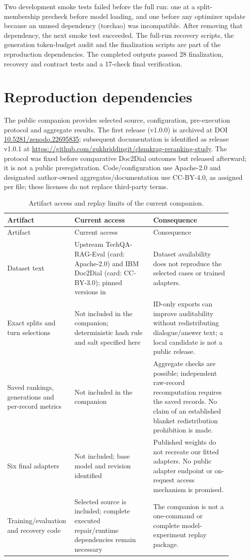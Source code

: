 Two development smoke tests failed before the full run: one at a split-membership precheck before model loading, and one before any optimizer update because an unused dependency (torchao) was incompatible. After removing that dependency, the next smoke test succeeded. The full-run recovery scripts, the generation token-budget audit and the finalization scripts are part of the reproduction dependencies. The completed outputs passed 28 finalization, recovery and contract tests and a 17-check final verification.

\section{Reproduction dependencies}\label{supp:repro}
The public companion provides selected source, configuration, pre-execution protocol and aggregate results. The first release (v1.0.0) is archived at DOI \href{https://doi.org/10.5281/zenodo.22695835}{\mbox{10.5281/zenodo.22695835}}; subsequent documentation is identified as release v1.0.1 at \url{https://github.com/zukhriddingit/chunkrag-reranking-study}. The protocol was fixed before comparative Doc2Dial outcomes but released afterward; it is not a public preregistration. Code/configuration use Apache-2.0 and designated author-owned aggregates/documentation use CC-BY-4.0, as assigned per file; these licenses do not replace third-party terms.

\begin{longtable}{P{0.24\linewidth}P{0.34\linewidth}P{0.34\linewidth}}
\caption{Artifact access and replay limits of the current companion.}\label{tab:access}\\
\toprule Artifact & Current access & Consequence\\\midrule\endfirsthead
\toprule Artifact & Current access & Consequence\\\midrule\endhead
Dataset text & Upstream TechQA-RAG-Eval (card: Apache-2.0) and IBM Doc2Dial (card: CC-BY-3.0); pinned versions in  & Dataset availability does not reproduce the selected cases or trained adapters.\\
Exact splits and turn selections & Not included in the companion; deterministic hash rule and salt specified here & ID-only exports can improve auditability without redistributing dialogue/answer text; a local candidate is not a public release.\\
Saved rankings, generations and per-record metrics & Not included in the companion & Aggregate checks are possible; independent raw-record recomputation requires the saved records. No claim of an established blanket redistribution prohibition is made.\\
Six final adapters & Not included; base model and revision identified & Published weights do not recreate our fitted adapters. No public adapter endpoint or on-request access mechanism is promised.\\
Training/evaluation and recovery code & Selected source is included; complete executed repair/runtime dependencies remain necessary & The companion is not a one-command or complete model-experiment replay package.\\\bottomrule
\end{longtable}


